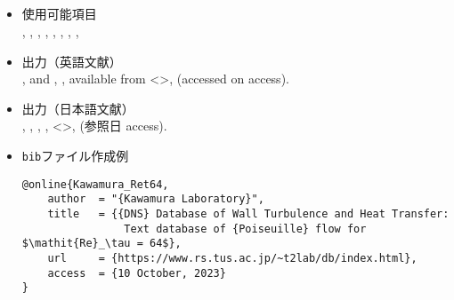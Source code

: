 \documentclass[a4paper,fleqn,uplatex,dvipdfmx]{jsarticle}
\begin{document}
\subsection{\ttonline}
\label{ssec:online}
\begin{screen}
    \begin{itemize}
        \item 使用可能項目 \\
        \ttauthor, \tttitle, \tthowpublished, \ttmonth, \ttyear, \tturl, \ttdoi, \ttaccess, \ttnote
        \item 出力（英語文献） \\
            \colorbox[gray]{0.8}{\ttauthorf}, \colorbox[gray]{0.8}{\ttauthors} and \colorbox[gray]{0.8}{\ttauthort}, \colorbox[gray]{0.8}{\tttitle}, available from \textless\colorbox[gray]{0.8}{\tturl}\textgreater, (accessed on \colorbox[gray]{0.8}{access}).
        \item 出力（日本語文献） \\
            \colorbox[gray]{0.8}{\ttauthorf}, \colorbox[gray]{0.8}{\ttauthors}, \colorbox[gray]{0.8}{\ttauthort}, \colorbox[gray]{0.8}{\tttitle}, \textless\colorbox[gray]{0.8}{\tturl}\textgreater, (参照日 \colorbox[gray]{0.8}{access}).
        \item \verb|bib|ファイル作成例 \vspace{-3mm}
\begin{verbatim}
@online{Kawamura_Ret64,
    author  = "{Kawamura Laboratory}",
    title   = {{DNS} Database of Wall Turbulence and Heat Transfer: 
                Text database of {Poiseuille} flow for $\mathit{Re}_\tau = 64$},
    url     = {https://www.rs.tus.ac.jp/~t2lab/db/index.html},
    access  = {10 October, 2023}
}
\end{verbatim}
    \end{itemize}
\end{screen}
\end{document}
